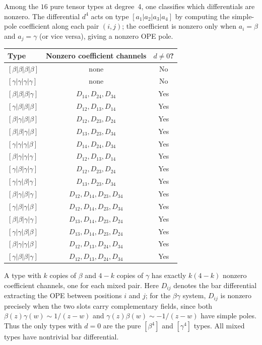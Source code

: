 \begin{computation}
\label{comp:degree4-nonzero-types}
Among the $16$ pure tensor types at degree~4, one classifies which
differentials are nonzero. The differential $d^4$ acts on type
$[a_1|a_2|a_3|a_4]$ by computing the simple-pole coefficient along
each pair $(i,j)$; the coefficient is nonzero only when
$a_i = \beta$ and $a_j = \gamma$ (or vice versa), giving a nonzero
OPE pole.

\begin{center}
\begin{tabular}{lcc}
\toprule
Type & Nonzero coefficient channels & $d \neq 0$? \\
\midrule
$[\beta|\beta|\beta|\beta]$ & none & No \\
$[\gamma|\gamma|\gamma|\gamma]$ & none & No \\
$[\beta|\beta|\beta|\gamma]$ & $D_{14}, D_{24}, D_{34}$ & Yes \\
$[\gamma|\beta|\beta|\beta]$ & $D_{12}, D_{13}, D_{14}$ & Yes \\
$[\beta|\gamma|\beta|\beta]$ & $D_{12}, D_{23}, D_{24}$ & Yes \\
$[\beta|\beta|\gamma|\beta]$ & $D_{13}, D_{23}, D_{34}$ & Yes \\
$[\gamma|\gamma|\gamma|\beta]$ & $D_{14}, D_{24}, D_{34}$ & Yes \\
$[\beta|\gamma|\gamma|\gamma]$ & $D_{12}, D_{13}, D_{14}$ & Yes \\
$[\gamma|\beta|\gamma|\gamma]$ & $D_{12}, D_{23}, D_{24}$ & Yes \\
$[\gamma|\gamma|\beta|\gamma]$ & $D_{13}, D_{23}, D_{34}$ & Yes \\
$[\beta|\gamma|\beta|\gamma]$ & $D_{12}, D_{14}, D_{23}, D_{34}$ & Yes \\
$[\gamma|\beta|\gamma|\beta]$ & $D_{12}, D_{14}, D_{23}, D_{34}$ & Yes \\
$[\beta|\beta|\gamma|\gamma]$ & $D_{13}, D_{14}, D_{23}, D_{24}$ & Yes \\
$[\gamma|\gamma|\beta|\beta]$ & $D_{13}, D_{14}, D_{23}, D_{24}$ & Yes \\
$[\beta|\gamma|\gamma|\beta]$ & $D_{12}, D_{13}, D_{24}, D_{34}$ & Yes \\
$[\gamma|\beta|\beta|\gamma]$ & $D_{12}, D_{13}, D_{24}, D_{34}$ & Yes \\
\bottomrule
\end{tabular}
\end{center}
A type with $k$ copies of $\beta$ and $4-k$ copies of $\gamma$ has exactly
$k(4-k)$ nonzero coefficient channels, one for each mixed pair. Here $D_{ij}$
denotes the bar differential extracting the OPE between positions $i$
and $j$; for the $\beta\gamma$ system, $D_{ij}$ is nonzero precisely
when the two slots carry complementary fields, since both
$\beta(z)\gamma(w) \sim 1/(z-w)$ and
$\gamma(z)\beta(w) \sim -1/(z-w)$ have simple poles.
Thus the only types with $d = 0$ are the pure $[\beta^4]$ and
$[\gamma^4]$ types. All mixed types have nontrivial bar differential.
\end{computation}

